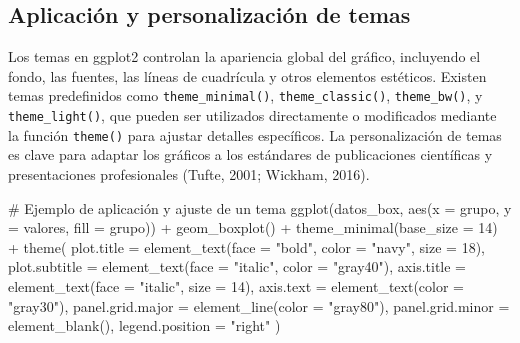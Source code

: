 \documentclass[
  spanish,
  a4paper,
  DIV=11,
  numbers=noendperiod,
  onepage,
  openany]{scrreprt}
\newenvironment{Shaded}{\begin{snugshade}}{\end{snugshade}}
\newcommand{\AttributeTok}[1]{\textcolor[rgb]{0.40,0.45,0.13}{#1}}
\newcommand{\CommentTok}[1]{\textcolor[rgb]{0.37,0.37,0.37}{#1}}
\newcommand{\DecValTok}[1]{\textcolor[rgb]{0.68,0.00,0.00}{#1}}
\newcommand{\FunctionTok}[1]{\textcolor[rgb]{0.28,0.35,0.67}{#1}}
\newcommand{\NormalTok}[1]{\textcolor[rgb]{0.00,0.23,0.31}{#1}}
\newcommand{\SpecialCharTok}[1]{\textcolor[rgb]{0.37,0.37,0.37}{#1}}
\newcommand{\StringTok}[1]{\textcolor[rgb]{0.13,0.47,0.30}{#1}}
\begin{document}
\subsection{Aplicación y personalización de
temas}\label{aplicaciuxf3n-y-personalizaciuxf3n-de-temas}

Los temas en ggplot2 controlan la apariencia global del gráfico,
incluyendo el fondo, las fuentes, las líneas de cuadrícula y otros
elementos estéticos. Existen temas predefinidos como
\texttt{theme\_minimal()}, \texttt{theme\_classic()},
\texttt{theme\_bw()}, y \texttt{theme\_light()}, que pueden ser
utilizados directamente o modificados mediante la función
\texttt{theme()} para ajustar detalles específicos. La personalización
de temas es clave para adaptar los gráficos a los estándares de
publicaciones científicas y presentaciones profesionales (Tufte, 2001;
Wickham, 2016).

\begin{Shaded}
\begin{Highlighting}[]
\CommentTok{\# Ejemplo de aplicación y ajuste de un tema}
\FunctionTok{ggplot}\NormalTok{(datos\_box, }\FunctionTok{aes}\NormalTok{(}\AttributeTok{x =}\NormalTok{ grupo, }\AttributeTok{y =}\NormalTok{ valores, }\AttributeTok{fill =}\NormalTok{ grupo)) }\SpecialCharTok{+}
  \FunctionTok{geom\_boxplot}\NormalTok{() }\SpecialCharTok{+}
  \FunctionTok{theme\_minimal}\NormalTok{(}\AttributeTok{base\_size =} \DecValTok{14}\NormalTok{) }\SpecialCharTok{+}
  \FunctionTok{theme}\NormalTok{(}
    \AttributeTok{plot.title =} \FunctionTok{element\_text}\NormalTok{(}\AttributeTok{face =} \StringTok{"bold"}\NormalTok{, }\AttributeTok{color =} \StringTok{"navy"}\NormalTok{, }\AttributeTok{size =} \DecValTok{18}\NormalTok{),}
    \AttributeTok{plot.subtitle =} \FunctionTok{element\_text}\NormalTok{(}\AttributeTok{face =} \StringTok{"italic"}\NormalTok{, }\AttributeTok{color =} \StringTok{"gray40"}\NormalTok{),}
    \AttributeTok{axis.title =} \FunctionTok{element\_text}\NormalTok{(}\AttributeTok{face =} \StringTok{"italic"}\NormalTok{, }\AttributeTok{size =} \DecValTok{14}\NormalTok{),}
    \AttributeTok{axis.text =} \FunctionTok{element\_text}\NormalTok{(}\AttributeTok{color =} \StringTok{"gray30"}\NormalTok{),}
    \AttributeTok{panel.grid.major =} \FunctionTok{element\_line}\NormalTok{(}\AttributeTok{color =} \StringTok{"gray80"}\NormalTok{),}
    \AttributeTok{panel.grid.minor =} \FunctionTok{element\_blank}\NormalTok{(),}
    \AttributeTok{legend.position =} \StringTok{"right"}
\NormalTok{  )}
\end{Highlighting}
\end{Shaded}
\end{document}
